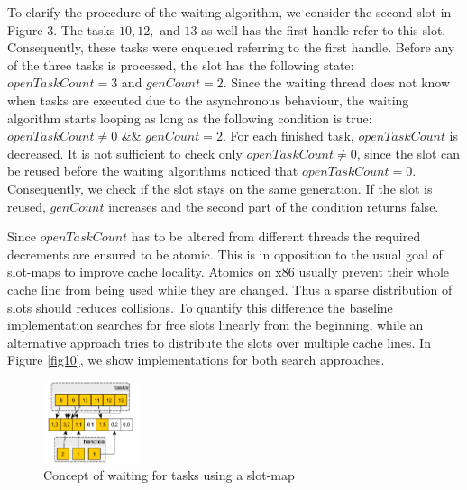 \documentclass[conference]{IEEEtran}
\begin{document}
To clarify the procedure of the waiting algorithm, we consider the second slot in Figure 3. The tasks $10, 12, $ and $13$ as well has the first handle refer to this slot. Consequently, these tasks were enqueued referring to the first handle. Before any of the three tasks is processed, the slot has the following state: $openTaskCount = 3$ and $genCount =  2$. Since the waiting thread does not know when tasks are executed due to the asynchronous behaviour, the waiting algorithm starts looping as long as the following condition is true: $openTaskCount \neq 0$ \&\& $genCount = 2$. For each finished task, $openTaskCount$ is decreased. It is not sufficient to check only $openTaskCount \neq 0$, since the slot can be reused before the waiting algorithms noticed that $openTaskCount = 0$. Consequently, we check if the slot stays on the same generation. If the slot is reused, $genCount$ increases and the second part of the condition returns false.

Since $openTaskCount$ has to be altered from different threads the required decrements are ensured to be atomic. This is in opposition to the usual goal of slot-maps to improve cache locality. Atomics on x86 usually prevent their whole cache line from being used while they are changed. Thus a sparse distribution of slots should reduces collisions. To quantify this difference the baseline implementation searches for free slots linearly from the beginning, while an alternative approach tries to distribute the slots over multiple cache lines. In Figure \ref{fig10}, we show implementations for both search approaches.

\begin{figure}
\centering	\includegraphics[width=0.25\textwidth]{img/waitingconcept.png}
	\caption{Concept of waiting for tasks using a slot-map}
	\label{fig2}
\end{figure}
\end{document}

